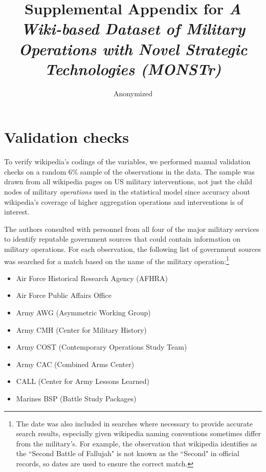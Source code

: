 \documentclass[fleqn,12pt]{article}
\title{\singlespacing Supplemental Appendix for \textit{A Wiki-based Dataset of Military Operations with Novel Strategic Technologies (MONSTr)}}
\author{Anonymized}
\date{}
\begin{document}
\maketitle

\doublespacing
\renewcommand\thetable{A\arabic{table}}
\renewcommand\thefigure{A\arabic{figure}}
\thispagestyle{empty}

\section{Validation checks}

To verify wikipedia's codings of the variables, we performed manual validation checks on a random 6\% sample of the observations in the data. The sample was drawn from all wikipedia pages on US military interventions, not just the child nodes of military \textit{operations} used in the statistical model since accuracy about wikipedia's coverage of higher aggregation operations and interventions is of interest.

The authors consulted with personnel from all four of the major military services to identify reputable government sources that could contain information on military operations. For each observation, the following list of government sources was searched for a match based on the name of the military operation:\footnote{The date was also included in searches where necessary to provide accurate search results, especially given wikipedia naming conventions sometimes differ from the military's. For example, the observation that wikipedia identifies as the ``Second Battle of Fallujah" is not known as the ``Second" in official records, so dates are used to ensure the correct match.}

\begin{itemize}
    \item Air Force Historical Research Agency (AFHRA)
    \item Air Force Public Affairs Office
    \item Army AWG (Asymmetric Working Group)
    \item Army CMH (Center for Military History)
    \item Army COST (Contemporary Operations Study Team)
    \item Army CAC (Combined Arms Center)
    \item CALL (Center for Army Lessons Learned)
    \item Marines BSP (Battle Study Packages)
\end{itemize}
\end{document}
